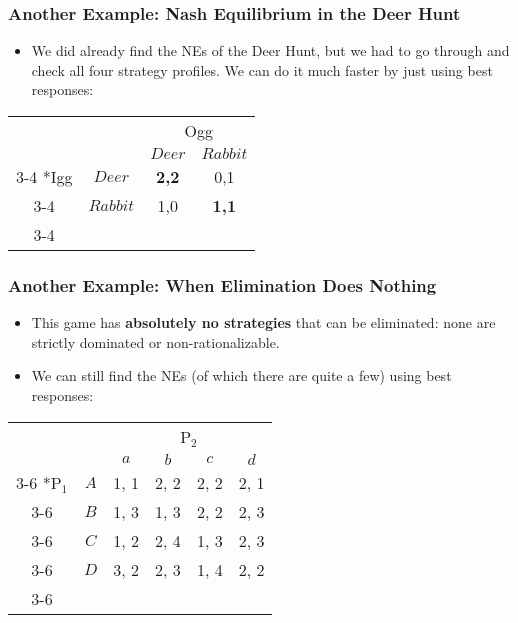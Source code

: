 \begin{frame}
\frametitle{Another Example: Nash Equilibrium in the Deer Hunt}
\begin{itemize}
	\item We did already find the NEs of the Deer Hunt, but we had to go through and check all four strategy profiles. We can do it much faster by just using best responses:
\end{itemize}
\begin{table}[h]
\centering
\begin{tabular}{cc|c|c|}
	& \multicolumn{1}{c}{} & \multicolumn{2}{c}{Ogg}\\
	& \multicolumn{1}{c}{} & \multicolumn{1}{c}{$Deer$}  & \multicolumn{1}{c}{$Rabbit$} \\\cline{3-4}
	\multirow{2}*{Igg}  & $Deer$ & \colorbox{blue!25}{\textbf{2,2}} & 0,1 \\\cline{3-4}
	& $Rabbit$ & 1,0 & \colorbox{blue!25}{\textbf{1,1}} \\\cline{3-4}
\end{tabular}
\end{table}
\end{frame}

\begin{frame}
\frametitle{Another Example: When Elimination Does Nothing}
\begin{itemize}
	\item This game has \textbf{absolutely no strategies} that can be eliminated: none are strictly dominated or non-rationalizable.
	\item We can still find the NEs (of which there are quite a few) using best responses:
\end{itemize}
\begin{table}[h]
	\centering
	\begin{tabular}{cc|c|c|c|c|}
		& \multicolumn{1}{c}{} & \multicolumn{4}{c}{P$_2$}\\
		& \multicolumn{1}{c}{} & \multicolumn{1}{c}{$a$} & \multicolumn{1}{c}{$b$} & \multicolumn{1}{c}{$c$} & \multicolumn{1}{c}{$d$}  \\\cline{3-6}
		\multirow{5}*{P$_1$}  & $A$ & 1, 1 & 2, 2 & 2, 2 & 2, 1 \\\cline{3-6}
		& $B$ & 1, 3 & 1, 3 & 2, 2 & 2, 3 \\\cline{3-6}
		& $C$ & 1, 2 & 2, 4 & 1, 3 & 2, 3 \\\cline{3-6}
		& $D$ & 3, 2 & 2, 3 & 1, 4 & 2, 2 \\\cline{3-6}
	\end{tabular}
\end{table}
\end{frame}


